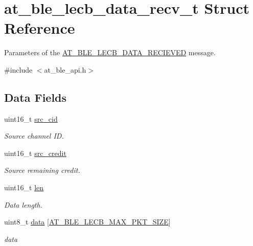 \hypertarget{structat__ble__lecb__data__recv__t}{}\section{at\+\_\+ble\+\_\+lecb\+\_\+data\+\_\+recv\+\_\+t Struct Reference}
\label{structat__ble__lecb__data__recv__t}


Parameters of the \mbox{\hyperlink{at__ble__api_8h_a3324640b95f33169515f89738ed5baeba5bc7d614586ec70755e6a85c18a4147c}{A\+T\+\_\+\+B\+L\+E\+\_\+\+L\+E\+C\+B\+\_\+\+D\+A\+T\+A\+\_\+\+R\+E\+C\+I\+E\+V\+ED}} message.  




{\ttfamily \#include $<$at\+\_\+ble\+\_\+api.\+h$>$}

\subsection*{Data Fields}
\begin{DoxyCompactItemize}
\item 
uint16\+\_\+t \mbox{\hyperlink{structat__ble__lecb__data__recv__t_aa474ed52f9f918464d40f59e24417ab0}{src\+\_\+cid}}
\begin{DoxyCompactList}\small\item\em Source channel ID. \end{DoxyCompactList}\item 
uint16\+\_\+t \mbox{\hyperlink{structat__ble__lecb__data__recv__t_a5e6b53fc6ab3be34fa0432c99ee05905}{src\+\_\+credit}}
\begin{DoxyCompactList}\small\item\em Source remaining credit. \end{DoxyCompactList}\item 
uint16\+\_\+t \mbox{\hyperlink{structat__ble__lecb__data__recv__t_a8aed22e2c7b283705ec82e0120515618}{len}}
\begin{DoxyCompactList}\small\item\em Data length. \end{DoxyCompactList}\item 
uint8\+\_\+t \mbox{\hyperlink{structat__ble__lecb__data__recv__t_aaf8ec5d1295d5becf78f077fd4284afe}{data}} \mbox{[}\mbox{\hyperlink{at__ble__api_8h_a4c284fdb7550bdc22991f4580a88c321}{A\+T\+\_\+\+B\+L\+E\+\_\+\+L\+E\+C\+B\+\_\+\+M\+A\+X\+\_\+\+P\+K\+T\+\_\+\+S\+I\+ZE}}\mbox{]}
\begin{DoxyCompactList}\small\item\em data \end{DoxyCompactList}\end{DoxyCompactItemize}


